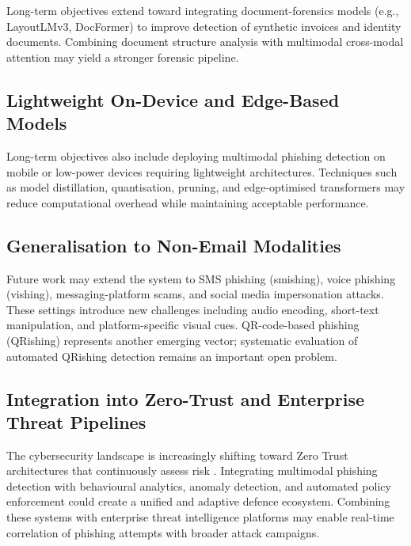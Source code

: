 \documentclass[conference]{IEEEtran}
\begin{document}
Long-term objectives extend toward integrating document-forensics models (e.g., LayoutLMv3, DocFormer) to improve detection of synthetic invoices and identity documents. Combining document structure analysis with multimodal cross-modal attention may yield a stronger forensic pipeline.

\subsection{Lightweight On-Device and Edge-Based Models}

Long-term objectives also include deploying multimodal phishing detection on mobile or low-power devices requiring lightweight architectures. Techniques such as model distillation, quantisation, pruning, and edge-optimised transformers may reduce computational overhead while maintaining acceptable performance.

\subsection{Generalisation to Non-Email Modalities}

Future work may extend the system to SMS phishing (smishing), voice phishing (vishing), messaging-platform scams, and social media impersonation attacks. These settings introduce new challenges including audio encoding, short-text manipulation, and platform-specific visual cues. QR-code-based phishing (QRishing) represents another emerging vector; systematic evaluation of automated QRishing detection remains an important open problem.

\subsection{Integration into Zero-Trust and Enterprise Threat Pipelines}

The cybersecurity landscape is increasingly shifting toward Zero Trust architectures that continuously assess risk \cite{rose_2020_zero_trust}. Integrating multimodal phishing detection with behavioural analytics, anomaly detection, and automated policy enforcement could create a unified and adaptive defence ecosystem. Combining these systems with enterprise threat intelligence platforms may enable real-time correlation of phishing attempts with broader attack campaigns.

\end{document}
